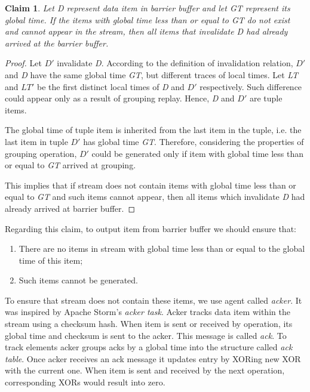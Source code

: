 \newtheorem{minimal-time-claim}{Claim}

\begin{minimal-time-claim}
Let {\it D} represent data item in barrier buffer and let {\it GT} represent its global time. If the items with global time less than or equal to {\it GT} do not exist and cannot appear in the stream, then all items that invalidate {\it D} had already arrived at the barrier buffer.
\end{minimal-time-claim}

\begin{proof}
Let {\it $D\prime$} invalidate {\it D}. According to the definition of invalidation relation, {\it $D\prime$} and {\it D} have the same global time {\it GT}, but different traces of local times. Let {\it LT} and {\it $LT\prime$} be the first distinct local times of {\it D} and {\it $D\prime$} respectively. Such difference could appear only as a result of grouping replay. Hence, {\it D} and {\it $D\prime$} are tuple items.

The global time of tuple item is inherited from the last item in the tuple, i.e. the last item in tuple {\it $D\prime$} has global time {\it GT}. Therefore, considering the properties of grouping operation, {\it $D\prime$} could be generated only if item with global time less than or equal to {\it GT} arrived at grouping. 

This implies that if stream does not contain items with global time less than or equal to {\it GT} and such items cannot appear, then all items which invalidate {\it D} had already arrived at barrier buffer. 
\end{proof}

Regarding this claim, to output item from barrier buffer we should ensure that:
\begin{enumerate}
    \item There are no items in stream with global time less than or equal to the global time of this item;
    \item Such items cannot be generated.
\end{enumerate}

To ensure that stream does not contain these items, we use agent called {\it acker}. It was inspired by Apache Storm's \cite{apache:storm} {\it acker task}. Acker tracks data item within the stream using a checksum hash. When item is sent or received by operation, its global time and checksum is sent to the acker. This message is called {\it ack}. To track elements acker groups acks by a global time into the structure called {\it ack table}. Once acker receives an ack message it updates entry by XORing new XOR with the current one. When item is sent and received by the next operation, corresponding XORs would result into zero.

